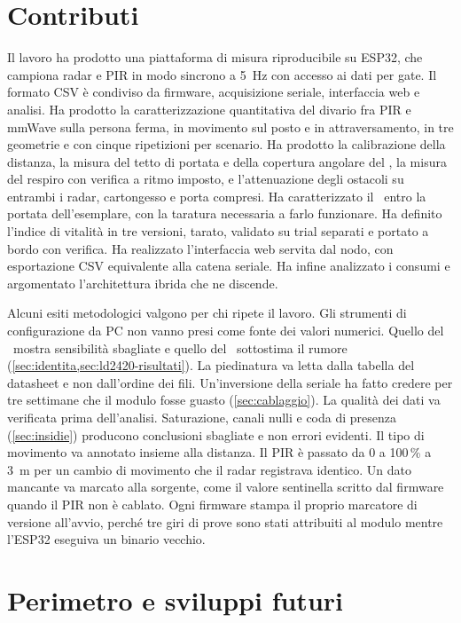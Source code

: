 \section{Contributi}
\label{sec:conclusioni-contributi}

Il lavoro ha prodotto una piattaforma di misura riproducibile su ESP32, che campiona
radar e PIR in modo sincrono a 5~Hz con accesso ai dati per gate. Il formato CSV è
condiviso da firmware, acquisizione seriale, interfaccia web e analisi. Ha prodotto la
caratterizzazione quantitativa del divario fra PIR e mmWave sulla persona ferma, in
movimento sul posto e in attraversamento, in tre geometrie e con cinque ripetizioni
per scenario. Ha prodotto la calibrazione della distanza, la misura del tetto di
portata e della copertura angolare del \ldb, la misura del respiro con verifica a
ritmo imposto, e l'attenuazione degli ostacoli su entrambi i radar, cartongesso e
porta compresi. Ha caratterizzato il \ldc\ entro la portata dell'esemplare, con la
taratura necessaria a farlo funzionare. Ha definito l'indice di vitalità in tre
versioni, tarato, validato su trial separati e portato a bordo con verifica. Ha
realizzato l'interfaccia web servita dal nodo, con esportazione CSV equivalente alla
catena seriale. Ha infine analizzato i consumi e argomentato l'architettura ibrida che
ne discende.

Alcuni esiti metodologici valgono per chi ripete il lavoro. Gli strumenti di
configurazione da PC non vanno presi come fonte dei valori numerici. Quello del \ldb\
mostra sensibilità sbagliate e quello del \ldc\ sottostima il rumore
(\cref{sec:identita,sec:ld2420-risultati}). La piedinatura va letta dalla tabella del
datasheet e non dall'ordine dei fili. Un'inversione della seriale ha fatto credere per
tre settimane che il modulo fosse guasto (\cref{sec:cablaggio}). La qualità dei dati
va verificata prima dell'analisi. Saturazione, canali nulli e coda di presenza
(\cref{sec:insidie}) producono conclusioni sbagliate e non errori evidenti. Il tipo di
movimento va annotato insieme alla distanza. Il PIR è passato da 0 a 100\,\% a 3~m per
un cambio di movimento che il radar registrava identico. Un dato mancante va marcato
alla sorgente, come il valore sentinella scritto dal firmware quando il PIR non è
cablato. Ogni firmware stampa il proprio marcatore di versione all'avvio, perché tre
giri di prove sono stati attribuiti al modulo mentre l'ESP32 eseguiva un binario
vecchio.

\section{Perimetro e sviluppi futuri}
\label{sec:conclusioni-sviluppi}

